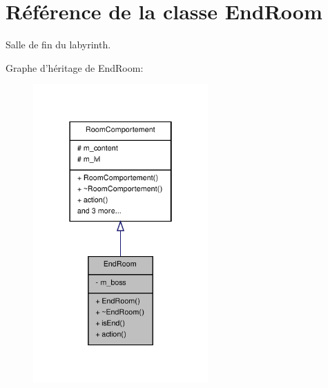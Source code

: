 \hypertarget{class_end_room}{\section{Référence de la classe End\-Room}
\label{class_end_room}
}


Salle de fin du labyrinth.  




Graphe d'héritage de End\-Room\-:
\nopagebreak
\begin{figure}[H]
\begin{center}
\leavevmode
\includegraphics[width=190pt]{class_end_room__inherit__graph}
\end{center}
\end{figure}


